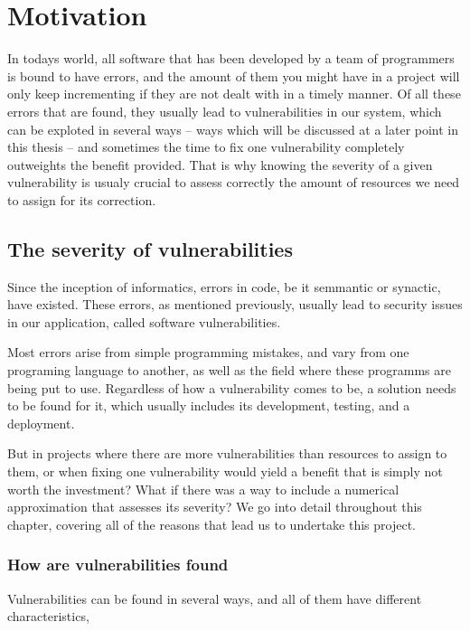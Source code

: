 
\chapter{Motivation}\label{chapter:Motivation}

In todays world, all software that has been developed by a team of programmers is bound to have errors, and the amount of them you might have in a project will only keep incrementing if they are not dealt with in a timely manner. Of all these errors that are found, they usually lead to vulnerabilities in our system, which can be exploted in several ways -- ways which will be discussed at a later point in this thesis -- and sometimes the time to fix one vulnerability completely outweights the benefit provided. That is why knowing the severity of a given vulnerability is usualy crucial to assess correctly the amount of resources we need to assign for its correction.

\section{The severity of vulnerabilities}
Since the inception of informatics, errors in code, be it semmantic or synactic, have existed. These errors, as mentioned previously, usually lead to security issues in our application, called software vulnerabilities.

Most errors arise from simple programming mistakes, and vary from one programing language to another, as well as the field where these programms are being put to use. Regardless of how a vulnerability comes to be, a solution needs to be found for it, which usually includes its development, testing, and a deployment.

But in projects where there are more vulnerabilities than resources to assign to them, or when fixing one vulnerability would yield a benefit that is simply not worth the investment? What if there was a way to include a numerical approximation that assesses its severity? We go into detail throughout this chapter, covering all of the reasons that lead us to undertake this project.

\subsection{How are vulnerabilities found}

Vulnerabilities can be found in several ways, and all of them have different characteristics, 

